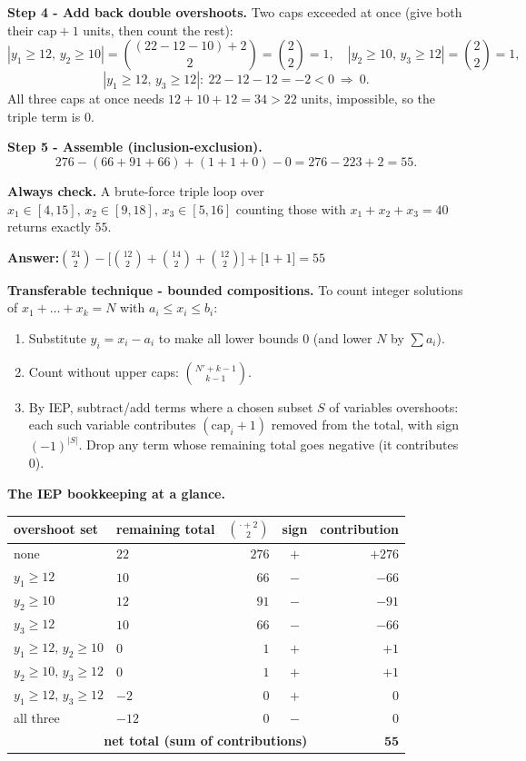 \documentclass[11pt,a4paper]{article}
\newcommand{\answer}[1]{\begin{answerbox}\centering\textbf{Answer:}\quad #1\end{answerbox}}
\begin{document}
\textbf{Step 4 - Add back double overshoots.}
Two caps exceeded at once (give both their $\text{cap}+1$ units, then count the rest):
$$|y_1\ge12,\,y_2\ge10|=\binom{(22-12-10)+2}{2}=\binom{2}{2}=1,\quad
  |y_2\ge10,\,y_3\ge12|=\binom{2}{2}=1,$$
$$|y_1\ge12,\,y_3\ge12|:\ 22-12-12=-2<0\ \Rightarrow\ 0.$$
All three caps at once needs $12+10+12=34>22$ units, impossible, so the triple term is $0$.

\textbf{Step 5 - Assemble (inclusion-exclusion).}
$$276-(66+91+66)+(1+1+0)-0=276-223+2=55.$$

\textbf{Always check.} A brute-force triple loop over $x_1\in[4,15],\,x_2\in[9,18],\,x_3\in[5,16]$
counting those with $x_1+x_2+x_3=40$ returns exactly $55$. \checkmark

\answer{$\displaystyle \binom{24}{2}-\Big[\binom{12}{2}+\binom{14}{2}+\binom{12}{2}\Big]+\big[1+1\big]=55$}

\begin{methodbox}
\textbf{Transferable technique - bounded compositions.} To count integer solutions of
$x_1+\dots+x_k=N$ with $a_i\le x_i\le b_i$:
\begin{enumerate}[nosep,leftmargin=2em]
  \item Substitute $y_i=x_i-a_i$ to make all lower bounds $0$ (and lower $N$ by $\sum a_i$).
  \item Count without upper caps: $\binom{N'+k-1}{k-1}$.
  \item By IEP, subtract/add terms where a chosen subset $S$ of variables overshoots: each such
        variable contributes $(\text{cap}_i+1)$ removed from the total, with sign $(-1)^{|S|}$. Drop
        any term whose remaining total goes negative (it contributes $0$).
\end{enumerate}
\end{methodbox}

\medskip
\textbf{The IEP bookkeeping at a glance.}
\begin{center}
\small
\renewcommand{\arraystretch}{1.15}
\begin{tabular}{@{}llrcr@{}}
\toprule
overshoot set & remaining total & $\binom{\cdot+2}{2}$ & sign & contribution\\
\midrule
none                 & $22$ & $276$ & $+$ & $+276$\\
$y_1\ge12$           & $10$ & $66$  & $-$ & $-66$\\
$y_2\ge10$           & $12$ & $91$  & $-$ & $-91$\\
$y_3\ge12$           & $10$ & $66$  & $-$ & $-66$\\
$y_1\ge12,\,y_2\ge10$& $0$  & $1$   & $+$ & $+1$\\
$y_2\ge10,\,y_3\ge12$& $0$  & $1$   & $+$ & $+1$\\
$y_1\ge12,\,y_3\ge12$& $-2$ & $0$   & $+$ & $0$\\
all three            & $-12$& $0$   & $-$ & $0$\\
\midrule
\multicolumn{4}{r}{\textbf{net total (sum of contributions)}} & $\mathbf{55}$\\
\bottomrule
\end{tabular}
\end{center}
\end{document}
